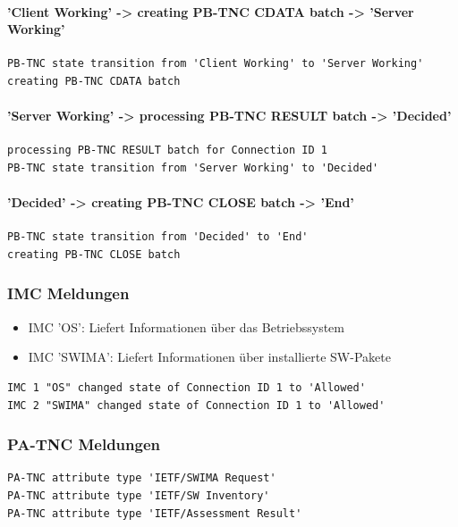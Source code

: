 \paragraph{'Client Working' -> creating PB-TNC CDATA batch -> 'Server Working'}
\begin{lstlisting}
PB-TNC state transition from 'Client Working' to 'Server Working'
creating PB-TNC CDATA batch
\end{lstlisting}

\paragraph{'Server Working' -> processing PB-TNC RESULT batch -> 'Decided'}
\begin{lstlisting}
processing PB-TNC RESULT batch for Connection ID 1
PB-TNC state transition from 'Server Working' to 'Decided'
\end{lstlisting}

\paragraph{'Decided' -> creating PB-TNC CLOSE batch -> 'End'}
\begin{lstlisting}
PB-TNC state transition from 'Decided' to 'End'
creating PB-TNC CLOSE batch
\end{lstlisting}

\subsubsection{IMC Meldungen}
\begin{itemize}
    \item IMC 'OS': Liefert Informationen über das Betriebssystem
    \item IMC 'SWIMA': Liefert Informationen über installierte SW-Pakete
\end{itemize}
\begin{lstlisting}
IMC 1 "OS" changed state of Connection ID 1 to 'Allowed'
IMC 2 "SWIMA" changed state of Connection ID 1 to 'Allowed'
\end{lstlisting}

\subsubsection{PA-TNC Meldungen}
\begin{lstlisting}
PA-TNC attribute type 'IETF/SWIMA Request'
PA-TNC attribute type 'IETF/SW Inventory'
PA-TNC attribute type 'IETF/Assessment Result'
\end{lstlisting}

